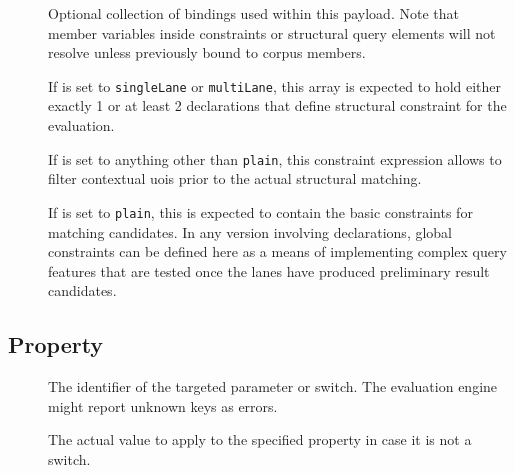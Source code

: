 \documentclass[11pt,a4paper]{article}
\begin{document}
\begin{description}
	\item[] Optional collection of bindings used within this payload. Note that member variables inside constraints or structural query elements will not resolve unless previously bound to corpus members.
	\item[] If  is set to \texttt{singleLane} or \texttt{multiLane}, this array is expected to hold either exactly 1 or at least 2  declarations that define structural constraint for the evaluation.
	\item[] If  is set to anything other than \texttt{plain}, this constraint expression allows to filter contextual \acp{uoi} prior to the actual structural matching.
	\item[] If  is set to \texttt{plain}, this is expected to contain the basic constraints for matching candidates. In any version involving  declarations, global constraints can be defined here as a means of implementing complex query features that are tested once the lanes have produced preliminary result candidates.
\end{description}

\subsection{Property}
\label{sec:json-ld-property}
\begin{attributes}{}
\end{attributes}
\begin{description}
	\item[] The identifier of the targeted parameter or switch. The evaluation engine might report unknown keys as errors.
	\item[] The actual value to apply to the specified property in case it is not a switch.
\end{description}
\end{document}
